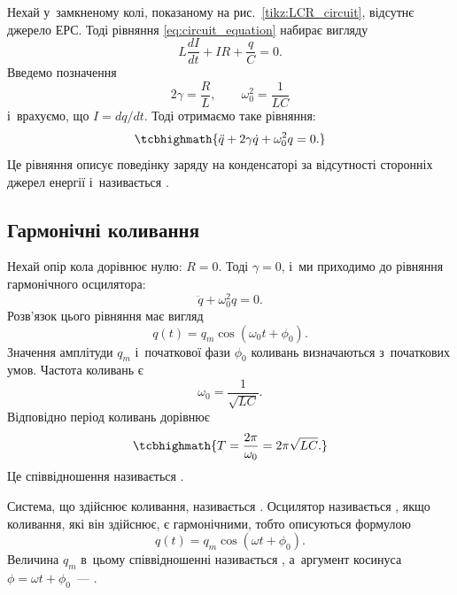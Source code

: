 Нехай у~замкненому колі, показаному на рис.~\ref{tikz:LCR_circuit}, відсутнє
джерело ЕРС. Тоді рівняння \eqref{eq:circuit_equation} набирає вигляду
\begin{equation*}
	L\frac{dI}{dt} + IR + \frac{q}{C} = 0.
\end{equation*}
Введемо позначення
\begin{equation}\label{eq:definitions}
	2\gamma = \frac{R}{L}, \qquad \omega_0^2 = \frac{1}{LC}
\end{equation}
і~врахуємо, що $I = dq/dt$. Тоді отримаємо таке рівняння:
\begin{equation}\label{eq:free_oscillation}
	\tcbhighmath{
		\ddot{q} + 2\gamma\dot{q} + \omega_0^2 q = 0.
	}
\end{equation}
Це рівняння описує поведінку заряду на конденсаторі за
відсутності сторонніх джерел енергії і~називається .

\subsection*{Гармонічні коливання}

Нехай опір кола дорівнює нулю: $R = 0$. Тоді $\gamma = 0$, і~ми
приходимо до рівняння гармонічного осцилятора:
\begin{equation}\label{eq:harmonic_equation}
	\ddot{q} + \omega_0^2 q = 0.
\end{equation}
Розв'язок цього рівняння має вигляд
\begin{equation*}
	q(t) = q_m \cos(\omega_0 t + \phi_0).
\end{equation*}
Значення амплітуди $q_m$ і~початкової фази $\phi_0$ коливань визначаються
з~початкових умов. Частота коливань є
\begin{equation*}
	\omega_0 = \frac{1}{\sqrt{LC}}.
\end{equation*}
Відповідно період коливань дорівнює
\begin{equation*}
	\tcbhighmath{
		T = \frac{2\pi}{\omega_0} = 2\pi\sqrt{LC}.
	}
\end{equation*}
Це співвідношення називається .

Система, що здійснює коливання, називається . Осцилятор називається
, якщо коливання, які він здійснює, є гармонічними, тобто описуються
формулою
\begin{equation*}
	q(t) = q_m \cos(\omega t + \phi_0).
\end{equation*}
Величина $q_m$ в~цьому співвідношенні називається , а~аргумент
косинуса $\phi = \omega t + \phi_0$~--- .

